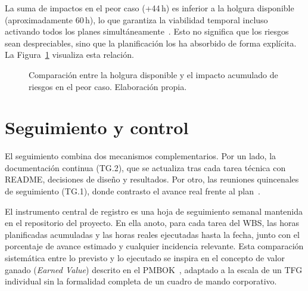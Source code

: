 \documentclass[11pt,a4paper]{article}
\begin{document}
La suma de impactos en el peor caso (+44\,h) es inferior a la holgura disponible (aproximadamente 60\,h), lo que garantiza la viabilidad temporal incluso activando todos los planes simultáneamente~\cite{pmbok}. Esto no significa que los riesgos sean despreciables, sino que la planificación los ha absorbido de forma explícita. La Figura~\ref{fig:holgura} visualiza esta relación.

\begin{figure}[H]
\centering
{}
\caption{Comparación entre la holgura disponible y el impacto acumulado de riesgos en el peor caso. Elaboración propia.}\label{fig:holgura}
\end{figure}

\section{Seguimiento y control}

El seguimiento combina dos mecanismos complementarios. Por un lado, la documentación continua (TG.2), que se actualiza tras cada tarea técnica con README, decisiones de diseño y resultados. Por otro, las reuniones quincenales de seguimiento (TG.1), donde contrasto el avance real frente al plan~\cite{gep23}.

El instrumento central de registro es una hoja de seguimiento semanal mantenida en el repositorio del proyecto. En ella anoto, para cada tarea del WBS, las horas planificadas acumuladas y las horas reales ejecutadas hasta la fecha, junto con el porcentaje de avance estimado y cualquier incidencia relevante. Esta comparación sistemática entre lo previsto y lo ejecutado se inspira en el concepto de valor ganado (\textit{Earned Value}) descrito en el PMBOK~\cite{pmbok}, adaptado a la escala de un TFG individual sin la formalidad completa de un cuadro de mando corporativo.
\end{document}
